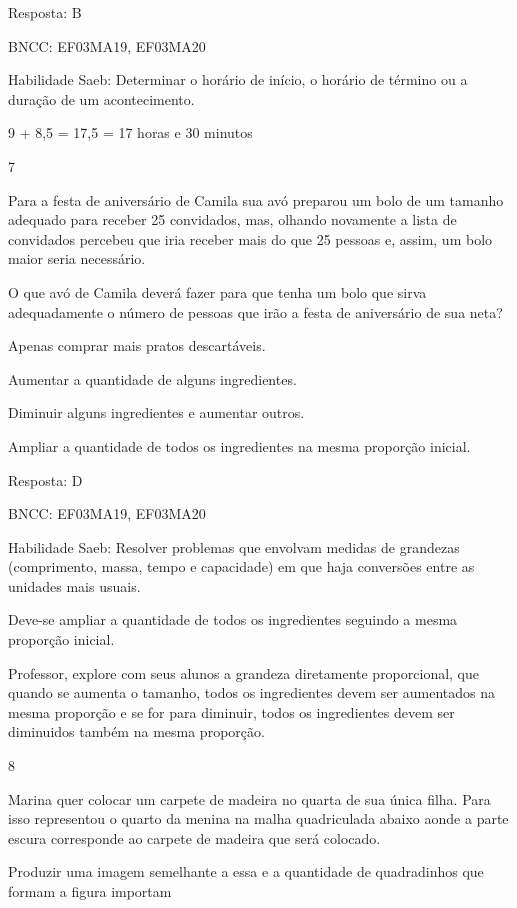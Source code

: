 \begin{escolha}
{\begin{escolha}
{Resposta: B

BNCC: EF03MA19, EF03MA20

Habilidade Saeb: Determinar o horário de início, o horário de término ou
a duração de um acontecimento.

9 + 8,5 = 17,5 = 17 horas e 30 minutos

\num{7}

Para a festa de aniversário de Camila sua avó preparou um bolo de um
tamanho adequado para receber 25 convidados, mas, olhando novamente a
lista de convidados percebeu que iria receber mais do que 25 pessoas e,
assim, um bolo maior seria necessário.

O que avó de Camila deverá fazer para que tenha um bolo que sirva
adequadamente o número de pessoas que irão a festa de aniversário de sua
neta?

\begin{escolha}
\item
  Apenas comprar mais pratos descartáveis.
\item
  Aumentar a quantidade de alguns ingredientes.
\item
  Diminuir alguns ingredientes e aumentar outros.
\item
  Ampliar a quantidade de todos os ingredientes na mesma proporção
  inicial.
\end{escolha}

Resposta: D

BNCC: EF03MA19, EF03MA20

Habilidade Saeb: Resolver problemas que envolvam medidas de grandezas
(comprimento, massa, tempo e capacidade) em que haja conversões entre as
unidades mais usuais.

Deve-se ampliar a quantidade de todos os ingredientes seguindo a mesma
proporção inicial.

Professor, explore com seus alunos a grandeza diretamente proporcional,
que quando se aumenta o tamanho, todos os ingredientes devem ser
aumentados na mesma proporção e se for para diminuir, todos os
ingredientes devem ser diminuidos também na mesma proporção.

\num{8}

Marina quer colocar um carpete de madeira no quarta de sua única filha.
Para isso representou o quarto da menina na malha quadriculada abaixo
aonde a parte escura corresponde ao carpete de madeira que será
colocado.

Produzir uma imagem semelhante a essa e a quantidade de quadradinhos que
formam a figura importam

}
\end{escolha}}
\end{escolha}
